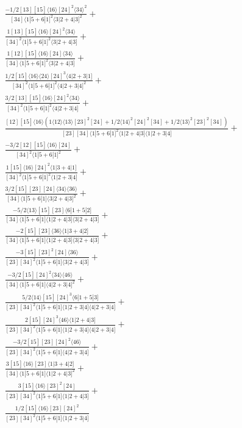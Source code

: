 \documentclass[varwidth, border=5pt]{standalone}
\begin{document}
\begin{my}
$\begin{gathered}
\scriptscriptstyle\frac{-1/2[13][15]⟨16⟩[24]^2⟨34⟩^2}{[34]⟨1|5+6|1]^2⟨3|2+4|3]^2}+\\
\scriptscriptstyle\frac{1[13][15]⟨16⟩[24]^2⟨34⟩}{[34]^2⟨1|5+6|1]^2⟨3|2+4|3]}+\\
\scriptscriptstyle\frac{1[12][15]⟨16⟩[24]⟨34⟩}{[34]⟨1|5+6|1]^2⟨3|2+4|3]}+\\
\scriptscriptstyle\frac{1/2[15]⟨16⟩⟨24⟩[24]^3⟨4|2+3|1]}{[34]^2⟨1|5+6|1]^2⟨4|2+3|4]^2}+\\
\scriptscriptstyle\frac{3/2[13][15]⟨16⟩[24]^2⟨34⟩}{[34]^2⟨1|5+6|1]^2⟨4|2+3|4]}+\\
\scriptscriptstyle\frac{[12][15]⟨16⟩(1⟨12⟩⟨13⟩[23]^2[24]+1/2⟨14⟩^2[24]^2[34]+1/2⟨13⟩^2[23]^2[34])}{[23][34]⟨1|5+6|1]^2⟨1|2+4|3]⟨1|2+3|4]}+\\
\scriptscriptstyle\frac{-3/2[12][15]⟨16⟩[24]}{[34]^2⟨1|5+6|1]^2}+\\
\scriptscriptstyle\frac{1[15]⟨16⟩[24]^2⟨1|3+4|1]}{[34]^2⟨1|5+6|1]^2⟨1|2+3|4]}+\\
\scriptscriptstyle\frac{3/2[15][23][24]⟨34⟩⟨36⟩}{[34]⟨1|5+6|1]⟨3|2+4|3]^2}+\\
\scriptscriptstyle\frac{-5/2⟨13⟩[15][23]⟨6|1+5|2]}{[34]⟨1|5+6|1]⟨1|2+4|3]⟨3|2+4|3]}+\\
\scriptscriptstyle\frac{-2[15][23]⟨36⟩⟨1|3+4|2]}{[34]⟨1|5+6|1]⟨1|2+4|3]⟨3|2+4|3]}+\\
\scriptscriptstyle\frac{-3[15][23]^2[24]⟨36⟩}{[23][34]^2⟨1|5+6|1]⟨3|2+4|3]}+\\
\scriptscriptstyle\frac{-3/2[15][24]^2⟨34⟩⟨46⟩}{[34]⟨1|5+6|1]⟨4|2+3|4]^2}+\\
\scriptscriptstyle\frac{5/2⟨14⟩[15][24]^3⟨6|1+5|3]}{[23][34]^2⟨1|5+6|1]⟨1|2+3|4]⟨4|2+3|4]}+\\
\scriptscriptstyle\frac{2[15][24]^3⟨46⟩⟨1|2+4|3]}{[23][34]^2⟨1|5+6|1]⟨1|2+3|4]⟨4|2+3|4]}+\\
\scriptscriptstyle\frac{-3/2[15][23][24]^2⟨46⟩}{[23][34]^2⟨1|5+6|1]⟨4|2+3|4]}+\\
\scriptscriptstyle\frac{3[15]⟨16⟩[23]⟨1|3+4|2]}{[34]⟨1|5+6|1]⟨1|2+4|3]^2}+\\
\scriptscriptstyle\frac{3[15]⟨16⟩[23]^2[24]}{[23][34]^2⟨1|5+6|1]⟨1|2+4|3]}+\\
\scriptscriptstyle\frac{1/2[15]⟨16⟩[23][24]^2}{[23][34]^2⟨1|5+6|1]⟨1|2+3|4]}\phantom{+}
\end{gathered}$
\end{my}
\end{document}
